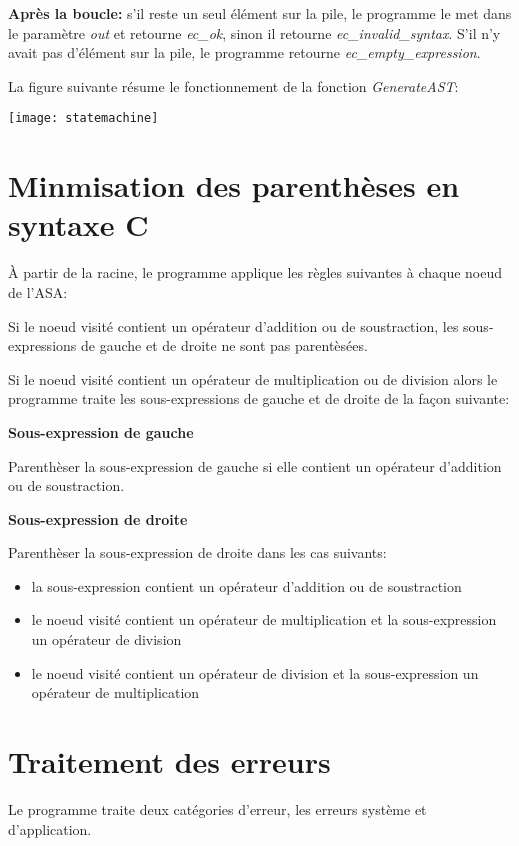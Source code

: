 \documentclass[10pt]{report}
\begin{document}
\textbf{Après la boucle:} s'il reste un seul élément sur la pile, le programme
le met dans le paramètre \emph{out} et retourne \emph{ec\_ok}, sinon il
retourne \emph{ec\_invalid\_syntax}.  S'il n'y avait pas d'élément sur la
pile, le programme retourne \emph{ec\_empty\_expression}.

La figure suivante résume le fonctionnement de la fonction \emph{GenerateAST}:

\begin{center}
  \texttt{[image: statemachine]}
\end{center}


\newpage

\section{Minmisation des parenthèses en syntaxe C}
À partir de la racine, le programme applique les règles suivantes à chaque noeud de
l'ASA:

Si le noeud visité contient un opérateur d'addition ou de soustraction,
les sous-expressions de gauche et de droite ne sont pas parentèsées.

Si le noeud visité contient un opérateur de multiplication ou de division
alors le programme traite les sous-expressions de gauche et de droite de la
façon suivante:

\textbf{Sous-expression de gauche}

Parenthèser la sous-expression de gauche si elle contient un opérateur d'addition ou de soustraction.

\textbf{Sous-expression de droite}

Parenthèser la sous-expression de droite dans les cas suivants:

\begin{itemize}
\item la sous-expression contient un opérateur d'addition ou de soustraction
\item le noeud visité contient un opérateur de multiplication et la sous-expression un opérateur de division
\item le noeud visité contient un opérateur de division et la sous-expression un opérateur de multiplication
\end{itemize}

\section{Traitement des erreurs}
Le programme traite deux catégories d'erreur, les erreurs système et
d'application.
\end{document}
